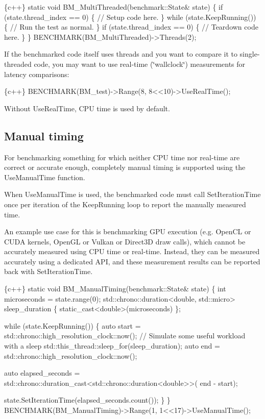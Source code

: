 \begin{DoxyCode}
\{c++\}
static void BM\_MultiThreaded(benchmark::State& state) \{
  if (state.thread\_index == 0) \{
    // Setup code here.
  \}
  while (state.KeepRunning()) \{
    // Run the test as normal.
  \}
  if (state.thread\_index == 0) \{
    // Teardown code here.
  \}
\}
BENCHMARK(BM\_MultiThreaded)->Threads(2);
\end{DoxyCode}


If the benchmarked code itself uses threads and you want to compare it to single-\/threaded code, you may want to use real-\/time (\char`\"{}wallclock\char`\"{}) measurements for latency comparisons\+:


\begin{DoxyCode}
\{c++\}
BENCHMARK(BM\_test)->Range(8, 8<<10)->UseRealTime();
\end{DoxyCode}


Without {\ttfamily Use\+Real\+Time}, C\+PU time is used by default.

\subsection*{Manual timing}

For benchmarking something for which neither C\+PU time nor real-\/time are correct or accurate enough, completely manual timing is supported using the {\ttfamily Use\+Manual\+Time} function.

When {\ttfamily Use\+Manual\+Time} is used, the benchmarked code must call {\ttfamily Set\+Iteration\+Time} once per iteration of the {\ttfamily Keep\+Running} loop to report the manually measured time.

An example use case for this is benchmarking G\+PU execution (e.\+g. Open\+CL or C\+U\+DA kernels, Open\+GL or Vulkan or Direct3D draw calls), which cannot be accurately measured using C\+PU time or real-\/time. Instead, they can be measured accurately using a dedicated A\+PI, and these measurement results can be reported back with {\ttfamily Set\+Iteration\+Time}.


\begin{DoxyCode}
\{c++\}
static void BM\_ManualTiming(benchmark::State& state) \{
  int microseconds = state.range(0);
  std::chrono::duration<double, std::micro> sleep\_duration \{
    static\_cast<double>(microseconds)
  \};

  while (state.KeepRunning()) \{
    auto start = std::chrono::high\_resolution\_clock::now();
    // Simulate some useful workload with a sleep
    std::this\_thread::sleep\_for(sleep\_duration);
    auto end   = std::chrono::high\_resolution\_clock::now();

    auto elapsed\_seconds =
      std::chrono::duration\_cast<std::chrono::duration<double>>(
        end - start);

    state.SetIterationTime(elapsed\_seconds.count());
  \}
\}
BENCHMARK(BM\_ManualTiming)->Range(1, 1<<17)->UseManualTime();
\end{DoxyCode}


